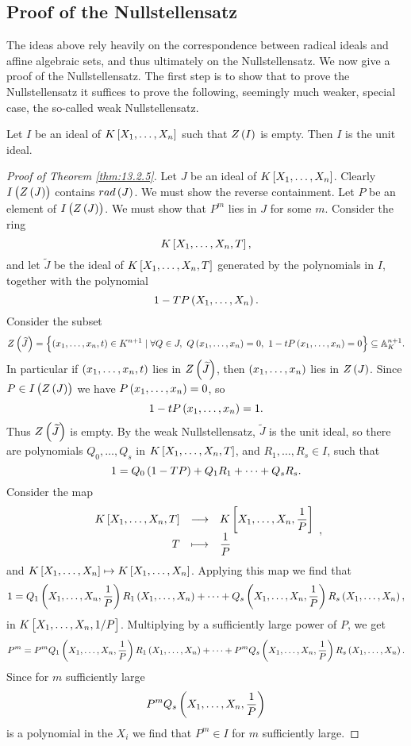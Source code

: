 \pagebreak

\subsection{Proof of the Nullstellensatz}

The ideas above rely heavily on the correspondence between radical ideals and affine algebraic sets, and thus ultimately on the Nullstellensatz. We now give a proof of the Nullstellensatz. The first step is to show that to prove the Nullstellensatz it suffices to prove the following, seemingly much weaker, special case, the so-called weak Nullstellensatz.

\begin{theorem}
\label{thm:13.3.1}
Let $ I $ be an ideal of $ K\sbr{X_1, \dots, X_n} $ such that $ Z\br{I} $ is empty. Then $ I $ is the unit ideal.
\end{theorem}

\begin{proof}[Proof of Theorem \ref{thm:13.2.5}]
Let $ J $ be an ideal of $ K\sbr{X_1, \dots, X_n} $. Clearly $ I\br{Z\br{J}} $ contains $ rad\br{J} $. We must show the reverse containment. Let $ P $ be an element of $ I\br{Z\br{J}} $. We must show that $ P^m $ lies in $ J $ for some $ m $. Consider the ring
$$ K\sbr{X_1, \dots, X_n, T}, $$
and let $ \widetilde{J} $ be the ideal of $ K\sbr{X_1, \dots, X_n, T} $ generated by the polynomials in $ I $, together with the polynomial
$$ 1 - TP\br{X_1, \dots, X_n}. $$
Consider the subset
$$ Z\br{\widetilde{J}} = \cbr{\br{x_1, \dots, x_n, t} \in K^{n + 1} \mid \forall Q \in J, \ Q\br{x_1, \dots, x_n} = 0, \ 1 - tP\br{x_1, \dots, x_n} = 0} \subseteq \A_K^{n + 1}. $$
In particular if $ \br{x_1, \dots, x_n, t} $ lies in $ Z\br{\widetilde{J}} $, then $ \br{x_1, \dots, x_n} $ lies in $ Z\br{J} $. Since $ P \in I\br{Z\br{J}} $ we have $ P\br{x_1, \dots, x_n} = 0 $, so
$$ 1 - tP\br{x_1, \dots, x_n} = 1. $$
Thus $ Z\br{\widetilde{J}} $ is empty. By the weak Nullstellensatz, $ \widetilde{J} $ is the unit ideal, so there are polynomials $ Q_0, \dots, Q_s $ in $ K\sbr{X_1, \dots, X_n, T} $, and $ R_1, \dots, R_s \in I $, such that
$$ 1 = Q_0\br{1 - TP} + Q_1R_1 + \dots + Q_sR_s. $$
Consider the map
$$ \function{K\sbr{X_1, \dots, X_n, T}}{K\sbr{X_1, \dots, X_n, \dfrac{1}{P}}}{T}{\dfrac{1}{P}}, $$
and $ K\sbr{X_1, \dots, X_n} \mapsto K\sbr{X_1, \dots, X_n} $. Applying this map we find that
$$ 1 = Q_1\br{X_1, \dots, X_n, \dfrac{1}{P}}R_1\br{X_1, \dots, X_n} + \dots + Q_s\br{X_1, \dots, X_n, \dfrac{1}{P}}R_s\br{X_1, \dots, X_n}, $$
in $ K\sbr{X_1, \dots, X_n, 1 / P} $. Multiplying by a sufficiently large power of $ P $, we get
$$ P^m = P^mQ_1\br{X_1, \dots, X_n, \dfrac{1}{P}}R_1\br{X_1, \dots, X_n} + \dots + P^mQ_s\br{X_1, \dots, X_n, \dfrac{1}{P}}R_s\br{X_1, \dots, X_n}. $$
Since for $ m $ sufficiently large
$$ P^mQ_s\br{X_1, \dots, X_n, \dfrac{1}{P}} $$
is a polynomial in the $ X_i $ we find that $ P^m \in I $ for $ m $ sufficiently large.
\end{proof}

